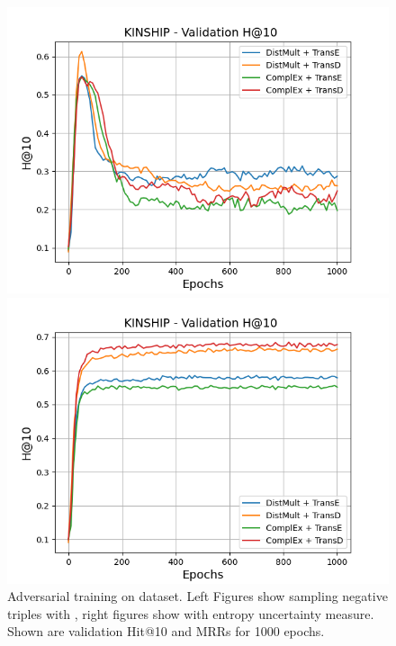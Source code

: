 \begin{figure}[H]
\begin{minipage}{.5\textwidth}
    \end{minipage}
    \begin{minipage}{.5\textwidth}
      \centering
      \includegraphics[width=0.9\linewidth]{figures/results/gan_train/not_pretrained/random/kinship/1k_epochs/random_kinship_hit10.png}
    \end{minipage}%
    \begin{minipage}{.5\textwidth}
      \centering
      \includegraphics[width=0.9\linewidth]{figures/results/gan_train/not_pretrained/uncertainty/max_distribution/entropy/kinship/1k_epochs/uncertainty_kinship_hit10.png}
    \end{minipage}%
    \caption{Adversarial training on \kinship dataset. 
    Left Figures show sampling negative triples with \origsampling, right figures show \ussoftmax with entropy uncertainty measure.
    Shown are validation Hit@10 and MRRs for 1000 epochs.}
    \label{fig:advtrain_kinship_random_vs_uncertainty}
\end{figure}

